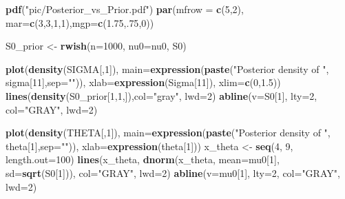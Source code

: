 \documentclass[12pt]{article}
\newenvironment{Shaded}{\begin{snugshade}}{\end{snugshade}}
\newcommand{\AttributeTok}[1]{\textcolor[rgb]{0.13,0.29,0.53}{#1}}
\newcommand{\DecValTok}[1]{\textcolor[rgb]{0.00,0.00,0.81}{#1}}
\newcommand{\FloatTok}[1]{\textcolor[rgb]{0.00,0.00,0.81}{#1}}
\newcommand{\FunctionTok}[1]{\textcolor[rgb]{0.13,0.29,0.53}{\textbf{#1}}}
\newcommand{\NormalTok}[1]{#1}
\newcommand{\OtherTok}[1]{\textcolor[rgb]{0.56,0.35,0.01}{#1}}
\newcommand{\StringTok}[1]{\textcolor[rgb]{0.31,0.60,0.02}{#1}}
\begin{document}
\begin{Shaded}
\begin{Highlighting}[]
\FunctionTok{pdf}\NormalTok{(}\StringTok{"pic/Posterior\_vs\_Prior.pdf"}\NormalTok{)}
\FunctionTok{par}\NormalTok{(}\AttributeTok{mfrow =} \FunctionTok{c}\NormalTok{(}\DecValTok{5}\NormalTok{,}\DecValTok{2}\NormalTok{), }\AttributeTok{mar=}\FunctionTok{c}\NormalTok{(}\DecValTok{3}\NormalTok{,}\DecValTok{3}\NormalTok{,}\DecValTok{1}\NormalTok{,}\DecValTok{1}\NormalTok{),}\AttributeTok{mgp=}\FunctionTok{c}\NormalTok{(}\FloatTok{1.75}\NormalTok{,.}\DecValTok{75}\NormalTok{,}\DecValTok{0}\NormalTok{))}

\NormalTok{S0\_prior }\OtherTok{\textless{}{-}} \FunctionTok{rwish}\NormalTok{(}\AttributeTok{n=}\DecValTok{1000}\NormalTok{, }\AttributeTok{nu0=}\NormalTok{nu0, S0)}

\FunctionTok{plot}\NormalTok{(}\FunctionTok{density}\NormalTok{(SIGMA[,}\DecValTok{1}\NormalTok{]), }
     \AttributeTok{main=}\FunctionTok{expression}\NormalTok{(}\FunctionTok{paste}\NormalTok{(}\StringTok{"Posterior density of "}\NormalTok{, sigma[}\DecValTok{11}\NormalTok{],}\AttributeTok{sep=}\StringTok{""}\NormalTok{)), }
     \AttributeTok{xlab=}\FunctionTok{expression}\NormalTok{(Sigma[}\DecValTok{11}\NormalTok{]), }\AttributeTok{xlim=}\FunctionTok{c}\NormalTok{(}\DecValTok{0}\NormalTok{,}\FloatTok{1.5}\NormalTok{))}
\FunctionTok{lines}\NormalTok{(}\FunctionTok{density}\NormalTok{(S0\_prior[}\DecValTok{1}\NormalTok{,}\DecValTok{1}\NormalTok{,]),}\AttributeTok{col=}\StringTok{"gray"}\NormalTok{, }\AttributeTok{lwd=}\DecValTok{2}\NormalTok{)}
\FunctionTok{abline}\NormalTok{(}\AttributeTok{v=}\NormalTok{S0[}\DecValTok{1}\NormalTok{], }\AttributeTok{lty=}\DecValTok{2}\NormalTok{, }\AttributeTok{col=}\StringTok{"GRAY"}\NormalTok{, }\AttributeTok{lwd=}\DecValTok{2}\NormalTok{)}

\FunctionTok{plot}\NormalTok{(}\FunctionTok{density}\NormalTok{(THETA[,}\DecValTok{1}\NormalTok{]), }
     \AttributeTok{main=}\FunctionTok{expression}\NormalTok{(}\FunctionTok{paste}\NormalTok{(}\StringTok{"Posterior density of "}\NormalTok{, theta[}\DecValTok{1}\NormalTok{],}\AttributeTok{sep=}\StringTok{""}\NormalTok{)), }
     \AttributeTok{xlab=}\FunctionTok{expression}\NormalTok{(theta[}\DecValTok{1}\NormalTok{]))}
\NormalTok{x\_theta }\OtherTok{\textless{}{-}} \FunctionTok{seq}\NormalTok{(}\DecValTok{4}\NormalTok{, }\DecValTok{9}\NormalTok{, }\AttributeTok{length.out=}\DecValTok{100}\NormalTok{)}
\FunctionTok{lines}\NormalTok{(x\_theta, }\FunctionTok{dnorm}\NormalTok{(x\_theta, }\AttributeTok{mean=}\NormalTok{mu0[}\DecValTok{1}\NormalTok{], }\AttributeTok{sd=}\FunctionTok{sqrt}\NormalTok{(S0[}\DecValTok{1}\NormalTok{])), }
      \AttributeTok{col=}\StringTok{"GRAY"}\NormalTok{, }\AttributeTok{lwd=}\DecValTok{2}\NormalTok{)}
\FunctionTok{abline}\NormalTok{(}\AttributeTok{v=}\NormalTok{mu0[}\DecValTok{1}\NormalTok{], }\AttributeTok{lty=}\DecValTok{2}\NormalTok{, }\AttributeTok{col=}\StringTok{"GRAY"}\NormalTok{, }\AttributeTok{lwd=}\DecValTok{2}\NormalTok{)}


\end{Highlighting}
\end{Shaded}
\end{document}
